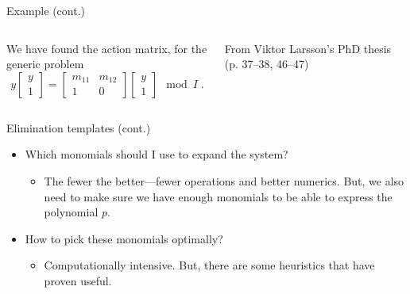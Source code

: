 \documentclass[aspectratio=169]{beamer}
\begin{document}
\begin{frame}[t]{Example (cont.)}
\vspace{1cm}
\begin{columns}
    \begin{column}{0.7\textwidth}
        We have found the action matrix, for the generic problem
        \begin{equation*}
            y\begin{bmatrix}
                y \\ 1
            \end{bmatrix}
            =
            \begin{bmatrix}
                m_{11} & m_{12} \\ 1 & 0
            \end{bmatrix}
            \begin{bmatrix}
                y \\ 1
            \end{bmatrix}
            {\mod I}\;.
        \end{equation*}
    \end{column}%
    \begin{column}{0.3\textwidth}
        \centering
        

        \vspace{5mm}

        {\scriptsize From Viktor Larsson's PhD thesis (p. 37--38, 46--47)}
    \end{column}
\end{columns}
\end{frame}

\begin{frame}{Elimination templates (cont.)}
\begin{itemize}
\item Which monomials should I use to expand the system?
    \begin{itemize}
    \item The fewer the better---fewer operations and better numerics. But, we also need to make sure we have enough monomials to be able to express the polynomial $p$.
    \end{itemize}
\item How to pick these monomials optimally?
    \begin{itemize}
    \item Computationally intensive. But, there are some heuristics that have proven useful.
    \end{itemize}
\end{itemize}
\end{frame}
\end{document}

